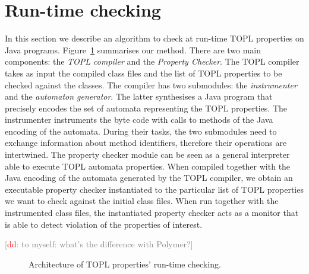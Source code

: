 \documentclass{llncs} %
\newcommand{\noterg}[2]{\textcolor{gray}{[\textcolor{red}{#1}: #2]}}
\newcommand{\dd}[1]{\noterg{dd}{#1}}
\newcommand{\dinocomment}[1]{\dd{#1}}
\begin{document}
\section{Run-time checking}
\label{sec:dynamic}
In this section we describe an algorithm to check at run-time  TOPL properties on Java programs.
%
Figure~\ref{architecture} summarises our method. There are two main components: 
the {\em TOPL compiler} and the {\em Property Checker}.
The TOPL compiler takes as input the compiled class files and the list of TOPL properties to be checked against the classes. The compiler has two submodules: the {\em instrumenter} and the {\em automaton generator}.
The latter synthesises a Java program that precisely encodes the set of automata representing the TOPL properties. The instrumenter instruments the byte code with calls to methods of the Java encoding of the automata.
During their tasks, the two submodules need to exchange information about method identifiers, therefore their operations are intertwined.   
The property checker module can be seen as a general interpreter able to execute TOPL automata properties. When compiled together with the Java encoding of the automata generated by the TOPL compiler, we obtain an executable property checker instantiated to the particular list of TOPL properties we want to check against the initial class files.
When run together with the instrumented class files, the instantiated property checker acts as a monitor that is able to detect violation of the properties of interest.

\dinocomment{to myself: what's the difference with Polymer?}
%
\begin{figure}[htbp]
\begin{center}

\caption{Architecture of TOPL properties' run-time checking.}
\label{architecture}
\end{center}
\end{figure}
\end{document}
